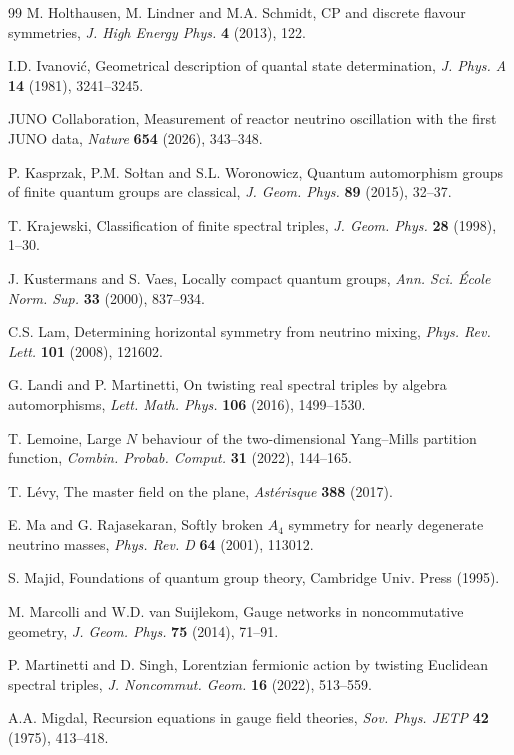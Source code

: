 \documentclass[11pt]{amsart}
\theoremstyle{definition}
\begin{document}
\begin{thebibliography}{99}
 M. Holthausen, M. Lindner and M.A. Schmidt, CP and discrete flavour symmetries, {\em J. High Energy Phys.} {\bf 4} (2013), 122.

 I.D. Ivanovi\'c, Geometrical description of quantal state determination, {\em J. Phys. A} {\bf 14} (1981), 3241--3245.

 JUNO Collaboration, Measurement of reactor neutrino oscillation with the first JUNO data, {\em Nature} {\bf 654} (2026), 343--348.

 P. Kasprzak, P.M. So\l tan and S.L. Woronowicz, Quantum automorphism groups of finite quantum groups are classical, {\em J. Geom. Phys.} {\bf 89} (2015), 32--37.

 T. Krajewski, Classification of finite spectral triples, {\em J. Geom. Phys.} {\bf 28} (1998), 1--30.

 J. Kustermans and S. Vaes, Locally compact quantum groups, {\em Ann. Sci. \'Ecole Norm. Sup.} {\bf 33} (2000), 837--934.

 C.S. Lam, Determining horizontal symmetry from neutrino mixing, {\em Phys. Rev. Lett.} {\bf 101} (2008), 121602.

 G. Landi and P. Martinetti, On twisting real spectral triples by algebra automorphisms, {\em Lett. Math. Phys.} {\bf 106} (2016), 1499--1530.

 T. Lemoine, Large $N$ behaviour of the two-dimensional Yang--Mills partition function, {\em Combin. Probab. Comput.} {\bf 31} (2022), 144--165.

 T. L\'evy, The master field on the plane, {\em Ast\'erisque} {\bf 388} (2017).

 E. Ma and G. Rajasekaran, Softly broken $A_4$ symmetry for nearly degenerate neutrino masses, {\em Phys. Rev. D} {\bf 64} (2001), 113012.

 S. Majid, Foundations of quantum group theory, Cambridge Univ. Press (1995).

 M. Marcolli and W.D. van Suijlekom, Gauge networks in noncommutative geometry, {\em J. Geom. Phys.} {\bf 75} (2014), 71--91.

 P. Martinetti and D. Singh, Lorentzian fermionic action by twisting Euclidean spectral triples, {\em J. Noncommut. Geom.} {\bf 16} (2022), 513--559.

 A.A. Migdal, Recursion equations in gauge field theories, {\em Sov. Phys. JETP} {\bf 42} (1975), 413--418.


\end{thebibliography}
\end{document}
